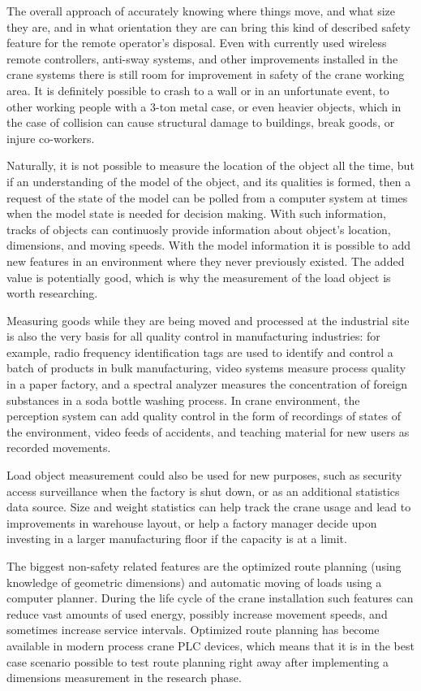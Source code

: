\documentclass[12pt,a4paper,oneside,pdftex]{report}
\begin{document}
The overall approach of accurately knowing where things move, and what size they are, and in what orientation they are can bring this kind of described safety feature for the remote operator's disposal. Even with currently used wireless remote controllers, anti-sway systems, and other improvements installed in the crane systems there is still room for improvement in safety of the crane working area. It is definitely possible to crash to a wall or in an unfortunate event, to other working people with a 3-ton metal case, or even heavier objects, which in the case of collision can cause structural damage to buildings, break goods, or injure co-workers.

Naturally, it is not possible to measure the location of the object all the time, but if an understanding of the model of the object, and its qualities is formed, then a request of the state of the model can be polled from a computer system at times when the model state is needed for decision making. With such information, tracks of objects can continuosly provide information about object's location, dimensions, and moving speeds. With the model information it is possible to add new features in an environment where they never previously existed. The added value is potentially good, which is why the measurement of the load object is worth researching.

Measuring goods while they are being moved and processed at the industrial site is also the very basis for all quality control in manufacturing industries: for example, radio frequency identification tags are used to identify and control a batch of products in bulk manufacturing, video systems measure process quality in a paper factory, and a spectral analyzer measures the concentration of foreign substances in a soda bottle washing process. In crane environment, the perception system can add quality control in the form of recordings of states of the environment, video feeds of accidents, and teaching material for new users as recorded movements. 

Load object measurement could also be used for new purposes, such as security access surveillance when the factory is shut down, or as an additional statistics data source. Size and weight statistics can help track the crane usage and lead to improvements in warehouse layout, or help a factory manager decide upon investing in a larger manufacturing floor if the capacity is at a limit.

 The biggest non-safety related features are the optimized route planning (using knowledge of geometric dimensions) and automatic moving of loads using a computer planner. During the life cycle of the crane installation such features can reduce vast amounts of used energy, possibly increase movement speeds, and sometimes increase service intervals. Optimized route planning has become available in modern process crane PLC devices, which means that it is in the best case scenario possible to test route planning right away after implementing a dimensions measurement in the research phase.
\end{document}
